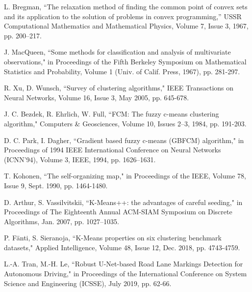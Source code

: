 \documentclass[conference]{IEEEtran}
\begin{document}





\begin{thebibliography}{00}

 L. Bregman, “The relaxation method of finding the common point of convex sets and its application to the solution of problems in convex programming,” USSR Computational Mathematics and Mathematical Physics, Volume 7, Issue 3, 1967, pp. 200–217.

 J. MacQueen, “Some methods for classification and analysis of multivariate observations," in Proceedings of the Fifth Berkeley Symposium on Mathematical Statistics and Probability, Volume 1 (Univ. of Calif. Press, 1967), pp. 281-297.

 R. Xu, D. Wunsch, “Survey of clustering algorithms," IEEE Transactions on Neural Networks, Volume 16, Issue 3, May 2005, pp. 645-678.

 J. C. Bezdek, R. Ehrlich, W. Full, “FCM: The fuzzy c-means clustering algorithm," Computers \& Geosciences, Volume 10, Issues 2–3, 1984, pp. 191-203.

 D. C. Park, I. Dagher, “Gradient based fuzzy c-means (GBFCM) algorithm," in Proceedings of 1994 IEEE International Conference on Neural Networks (ICNN’94), Volume 3, IEEE, 1994, pp. 1626–1631.

 T. Kohonen, “The self-organizing map," in Proceedings of the IEEE, Volume 78, Issue 9, Sept. 1990, pp. 1464-1480.

 D. Arthur, S. Vassilvitskii, “K-Means++: the advantages of careful seeding," in Proceedings of The Eighteenth Annual ACM-SIAM Symposium on Discrete Algorithms, Jan. 2007, pp. 1027–1035.

 P. Fänti, S. Sieranoja, “K-Means properties on six clustering benchmark datasets," Applied Intelligence, Volume 48, Issue 12, Dec. 2018, pp. 4743-4759.

 L.-A. Tran, M.-H. Le, “Robust U-Net-based Road Lane Markings Detection for Autonomous Driving," in Proceedings of the International Conference on System Science and Engineering (ICSSE), July 2019, pp. 62-66.

\end{thebibliography}
\end{document}
